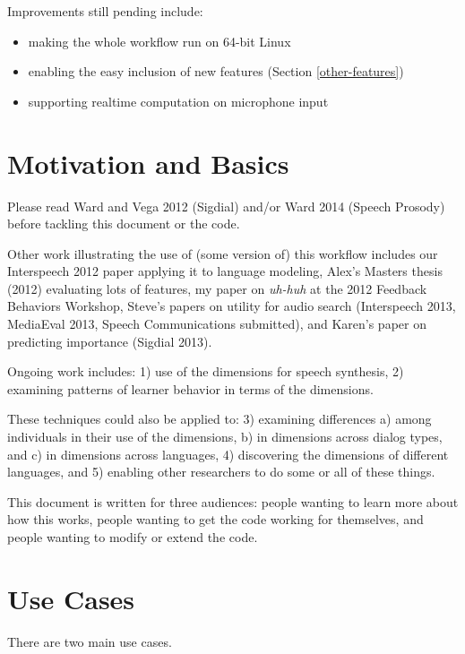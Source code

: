 \documentclass[11pt]{article}
\begin{document}
Improvements still pending include:
\begin{itemize}   \setlength{\itemsep}{0pt}\setlength{\parskip}{0pt}
\item making the whole workflow run on 64-bit Linux 
\item enabling the easy inclusion of new features (Section
  \ref{other-features})
\item supporting realtime computation on microphone input
\end{itemize}

\section{Motivation and Basics}

Please read Ward and Vega 2012 (Sigdial) and/or Ward 2014 (Speech
Prosody) before tackling this document or the code.

Other work illustrating the use of (some version of) this workflow
includes our Interspeech 2012 paper applying it to language modeling,
Alex's Masters thesis (2012) evaluating lots of features, my paper on
{\em uh-huh} at the 2012 Feedback Behaviors Workshop, Steve's papers
on utility for audio search (Interspeech 2013, MediaEval 2013, Speech
Communications submitted), and Karen's paper on predicting importance
(Sigdial 2013).

Ongoing work includes: 1) use of the dimensions for speech synthesis,
2) examining patterns of learner behavior in terms of the dimensions.

These techniques could also be applied to:
3) examining differences a) among individuals in their use of the
dimensions, b) in dimensions across dialog types, and c) in dimensions
across languages, 4) discovering the dimensions of different
languages, and 5) enabling other researchers to do some or all of
these things.

This document is written for three audiences: people wanting to learn
more about how this works, people wanting to get the code working for
themselves, and people wanting to modify or extend the code.

\section{Use Cases}

There are two main use cases.  
\end{document}
